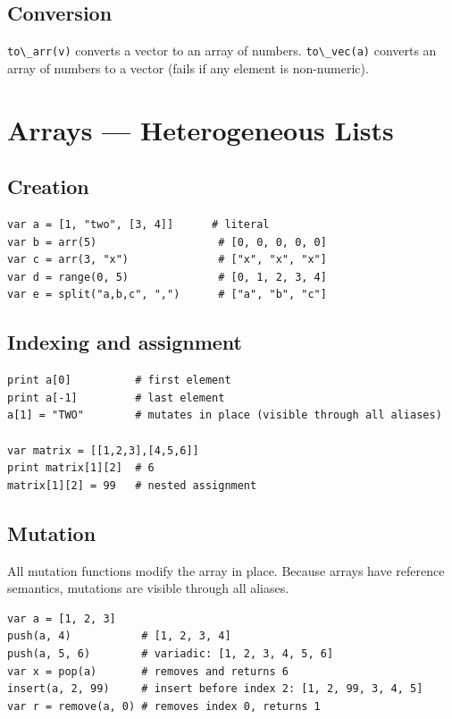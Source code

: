 \documentclass[11pt,a4paper]{article}
\newcommand{\musil}[1]{\lstinline[style=musilinline]{#1}}
\begin{document}
\subsection{Conversion}

\musil{to\_arr(v)} converts a vector to an array of numbers. \musil{to\_vec(a)}
converts an array of numbers to a vector (fails if any element is non-numeric).

\section{Arrays — Heterogeneous Lists}
\label{sec:arrays}

\subsection{Creation}

\begin{lstlisting}
var a = [1, "two", [3, 4]]      # literal
var b = arr(5)                   # [0, 0, 0, 0, 0]
var c = arr(3, "x")              # ["x", "x", "x"]
var d = range(0, 5)              # [0, 1, 2, 3, 4]
var e = split("a,b,c", ",")      # ["a", "b", "c"]
\end{lstlisting}

\subsection{Indexing and assignment}

\begin{lstlisting}
print a[0]          # first element
print a[-1]         # last element
a[1] = "TWO"        # mutates in place (visible through all aliases)

var matrix = [[1,2,3],[4,5,6]]
print matrix[1][2]  # 6
matrix[1][2] = 99   # nested assignment
\end{lstlisting}

\subsection{Mutation}

All mutation functions modify the array in place. Because arrays have reference
semantics, mutations are visible through all aliases.

\begin{lstlisting}
var a = [1, 2, 3]
push(a, 4)           # [1, 2, 3, 4]
push(a, 5, 6)        # variadic: [1, 2, 3, 4, 5, 6]
var x = pop(a)       # removes and returns 6
insert(a, 2, 99)     # insert before index 2: [1, 2, 99, 3, 4, 5]
var r = remove(a, 0) # removes index 0, returns 1
\end{lstlisting}
\end{document}
